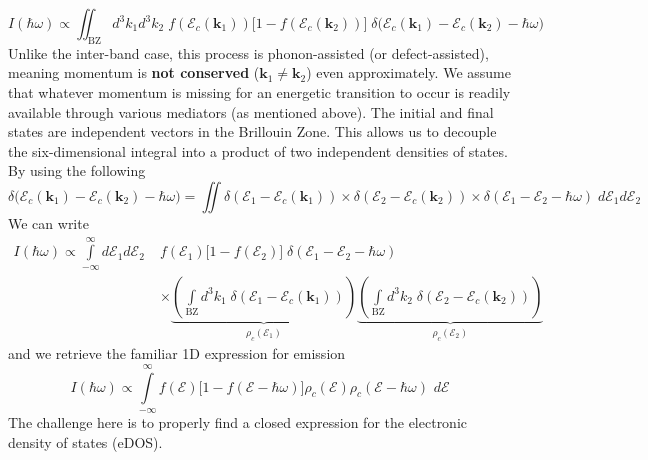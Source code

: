 \begin{equation}
I(\hbar\omega) \propto \iint_{\text{BZ}} d^{3}k_{1} d^{3}k_{2} \; f(\mathcal{E}_{c}(\mathbf{k}_{1})) \Big[1-f(\mathcal{E}_{c}(\mathbf{k}_{2}))\Big] \; \delta\Big(\mathcal{E}_{c}(\mathbf{k}_{1}) - \mathcal{E}_{c}(\mathbf{k}_{2}) - \hbar\omega \Big)
\label{eq:quadratic_intraband_general_integral}
\end{equation}
Unlike the inter-band case, this process is phonon-assisted (or defect-assisted), meaning momentum is \textbf{not conserved} ($\mathbf{k}_1 \neq \mathbf{k}_2$) even approximately. We assume that whatever momentum is missing for an energetic transition to occur is readily available through various mediators (as mentioned above). The initial and final states are independent vectors in the Brillouin Zone. This allows us to decouple the six-dimensional integral into a product of two independent densities of states. By using the following
\begin{equation}
\delta\Big(\mathcal{E}_{c}(\mathbf{k}_{1}) - \mathcal{E}_{c}(\mathbf{k}_{2}) - \hbar\omega \Big) = \iint\limits \delta(\mathcal{E}_1 - \mathcal{E}_c(\mathbf{k}_1)) \times \delta(\mathcal{E}_2 - \mathcal{E}_c(\mathbf{k}_2))  \times \delta(\mathcal{E}_1 - \mathcal{E}_2 - \hbar\omega) \; d\mathcal{E}_{1}d\mathcal{E}_{2}
\label{eq:quadratic_intraband_delta_decomposition}
\end{equation}
We can write
\begin{align}
I(\hbar\omega) \propto \int\limits_{-\infty}^{\infty} d\mathcal{E}_1 d\mathcal{E}_2 \;& f(\mathcal{E}_1) \Big[1-f(\mathcal{E}_2)\Big] \; \delta(\mathcal{E}_1 - \mathcal{E}_2 - \hbar\omega) \\ &\times \underbrace{\left( \int\limits_{\text{BZ}} d^3k_1 \; \delta(\mathcal{E}_1 - \mathcal{E}_c(\mathbf{k}_1)) \right)}_{\rho_c(\mathcal{E}_1)} \underbrace{\left( \int\limits_{\text{BZ}} d^3k_2 \; \delta(\mathcal{E}_2 - \mathcal{E}_c(\mathbf{k}_2)) \right)}_{\rho_c(\mathcal{E}_2)} 
\label{eq:quadratic_intraband_dos_factorization}
\end{align}
and we retrieve the familiar 1D expression for emission
\begin{equation}
I(\hbar\omega)\propto \int\limits_{-\infty}^{\infty} f(\mathcal{E})\Big[ 1-f(\mathcal{E-\hbar\omega}) \Big] \rho_{c}(\mathcal{E})\rho_{c}(\mathcal{E-\hbar\omega})\,\, d\mathcal{E}
\label{eq:quadratic_intraband_1d_expression}
\end{equation}
The challenge here is to properly find a closed expression for the electronic density of states (eDOS).

